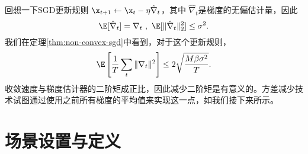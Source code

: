 回想一下SGD更新规则 $\x_{t+1} \leftarrow \x_t - \eta \hat{\nabla}_t$，其中 $\hat{\nabla}_t$是梯度的无偏估计量，因此
$$  \E[\hat{\nabla}_t] = \nabla_t \ ,  \ \E[\| \hat{\nabla}_t \|_2^2] \leq \sigma^2 . $$ 
我们在定理\ref{thm:non-convex-sgd}中看到，对于这个更新规则，
$$ \E \left[ \frac{1}{T} \sum_t \| \nabla_t  \|^2 \right]  \leq  2 \sqrt{\frac{M \beta \sigma^2 }{T} }.$$
收敛速度与梯度估计器的二阶矩成正比，因此减少二阶矩是有意义的。方差减少技术试图通过使用之前所有梯度的平均值来实现这一点，如我们接下来所示。


\section{
    场景设置与定义
    }

